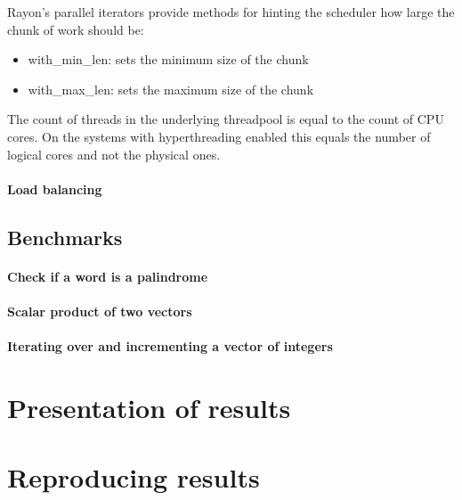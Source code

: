 Rayon's parallel iterators provide methods for hinting the scheduler how large the chunk of work should be: 
\begin{itemize}
    \item with\_min\_len: sets the minimum size of the chunk
    \item with\_max\_len: sets the maximum size of the chunk
\end{itemize}


The count of threads in the underlying threadpool is equal to the count of CPU cores. On the systems with hyperthreading enabled this equals the number of logical cores and not the physical ones. 

\paragraph*{Load balancing}

\subsection{Benchmarks}

\paragraph*{Check if a word is a palindrome}

\paragraph*{Scalar product of two vectors}

\paragraph*{Iterating over and incrementing a vector of integers}

\section{Presentation of results}

\section{Reproducing results}
